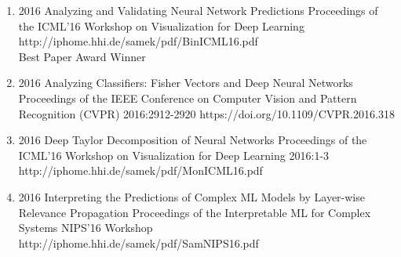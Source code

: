 {\begin{enumerate}
        \item {}
                                {2016}
                                {Analyzing and Validating Neural Network Predictions}
                                {Proceedings of the ICML'16 Workshop on Visualization for Deep Learning}
                                {}
                                {http://iphome.hhi.de/samek/pdf/BinICML16.pdf}
                                {\\Best Paper Award Winner}

        \item {}
                                {2016}
                                {Analyzing Classifiers: Fisher Vectors and Deep Neural Networks}
                                {Proceedings of the IEEE Conference on Computer Vision and Pattern Recognition (CVPR)}
                                {2016:2912-2920}
                                {https://doi.org/10.1109/CVPR.2016.318}

        \item {}
                                {2016}
                                {Deep Taylor Decomposition of Neural Networks}
                                {Proceedings of the ICML'16 Workshop on Visualization for Deep Learning}
                                {2016:1-3}
                                {http://iphome.hhi.de/samek/pdf/MonICML16.pdf}

        \item {}
                                {2016}
                                {Interpreting the Predictions of Complex ML Models by Layer-wise Relevance Propagation}
                                {Proceedings of the Interpretable ML for Complex Systems NIPS'16 Workshop}
                                {}
                                {http://iphome.hhi.de/samek/pdf/SamNIPS16.pdf}

    \end{enumerate}
}
